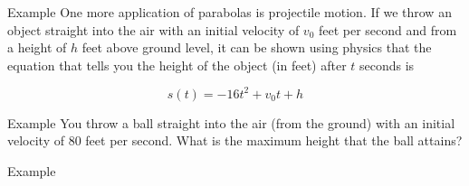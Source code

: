 \documentclass[presentation]{beamer}
\begin{document}
\begin{frame}[label={sec:org9540abf}]{Example}
One more application of parabolas is projectile motion.  If we throw
an object straight into the air with an initial velocity of \(v_0\)
feet per second and from a height of \(h\) feet above ground level, it
can be shown using physics that the equation that tells you the height
of the object (in feet) after \(t\) seconds is

\[s(t) = -16t^2 + v_0 t + h\]
\vspace{10in}
\end{frame}

\begin{frame}[label={sec:org9ef9710}]{Example}
You throw a ball straight into the air (from the ground) with an
initial velocity of 80 feet per second.  What is the maximum height
that the ball attains?

\vspace{10in}
\end{frame}

\begin{frame}[label={sec:orgb42ed82}]{Example}
\end{frame}
\end{document}
